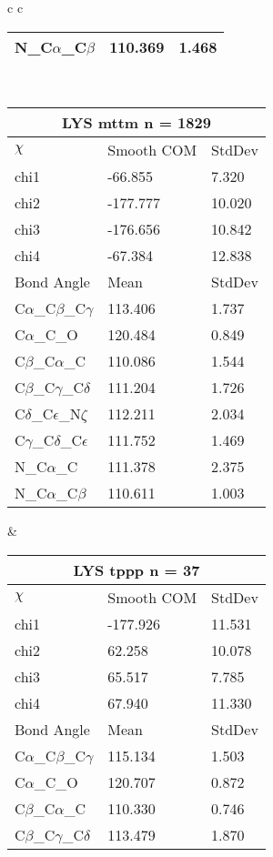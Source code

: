 \begin{longtable}{ c c }
\begin{tabular}{ l l l }
  N\_C$\alpha$\_C$\beta$ & 110.369 & 1.468\\
  \bottomrule
  \end{tabular}
  \\
  \begin{tabular}{ l l l }
  \toprule
  \multicolumn{3}{c}{LYS \textbf{mttm} n = 1829} \\ \toprule
  $\chi$       & Smooth COM & StdDev \\ \midrule
  chi1 & -66.855 & 7.320 \\ 
  chi2 & -177.777 & 10.020 \\ 
  chi3 & -176.656 & 10.842 \\ 
  chi4 & -67.384 & 12.838 \\ \midrule
  Bond Angle   & Mean     & StdDev \\ \midrule
  C$\alpha$\_C$\beta$\_C$\gamma$ & 113.406 & 1.737\\
  C$\alpha$\_C\_O & 120.484 & 0.849\\
  C$\beta$\_C$\alpha$\_C & 110.086 & 1.544\\
  C$\beta$\_C$\gamma$\_C$\delta$ & 111.204 & 1.726\\
  C$\delta$\_C$\epsilon$\_N$\zeta$ & 112.211 & 2.034\\
  C$\gamma$\_C$\delta$\_C$\epsilon$ & 111.752 & 1.469\\
  N\_C$\alpha$\_C & 111.378 & 2.375\\
  N\_C$\alpha$\_C$\beta$ & 110.611 & 1.003\\
  \bottomrule
  \end{tabular}
  &
  \begin{tabular}{ l l l }
  \toprule
  \multicolumn{3}{c}{LYS \textbf{tppp} n = 37} \\ \toprule
  $\chi$       & Smooth COM & StdDev \\ \midrule
  chi1 & -177.926 & 11.531 \\ 
  chi2 & 62.258 & 10.078 \\ 
  chi3 & 65.517 & 7.785 \\ 
  chi4 & 67.940 & 11.330 \\ \midrule
  Bond Angle   & Mean     & StdDev \\ \midrule
  C$\alpha$\_C$\beta$\_C$\gamma$ & 115.134 & 1.503\\
  C$\alpha$\_C\_O & 120.707 & 0.872\\
  C$\beta$\_C$\alpha$\_C & 110.330 & 0.746\\
  C$\beta$\_C$\gamma$\_C$\delta$ & 113.479 & 1.870\\

\end{tabular}
\end{longtable}
